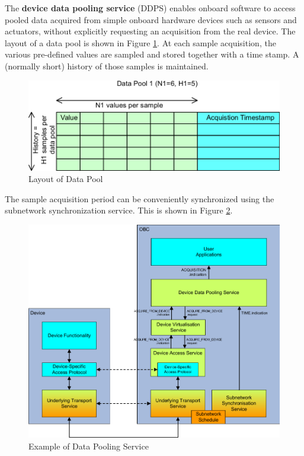 The \textbf{device data pooling service} (DDPS) enables onboard software to access pooled data acquired from simple onboard hardware devices such as sensors and actuators, without explicitly requesting an acquisition from the real device. The layout of a data pool is shown in Figure \ref{fig:Layout of Data Pool}. At each sample acquisition, the various pre-defined values are sampled and stored together with a time stamp. A (normally short) history of those samples is maintained.

\begin{figure}[h]
\centering\includegraphics[scale=0.3]{fig/layout_of_data_pool}
\caption{Layout of Data Pool}
\label{fig:Layout of Data Pool}
\end{figure}

The sample acquisition period can be conveniently synchronized using the subnetwork synchronization service. This is shown in Figure \ref{fig:Example of Data Pooling Service}.

\begin{figure}[h]
\centering\includegraphics[scale=0.3]{fig/example_of_data_pooling_service}
\caption{Example of Data Pooling Service}
\label{fig:Example of Data Pooling Service}
\end{figure}

